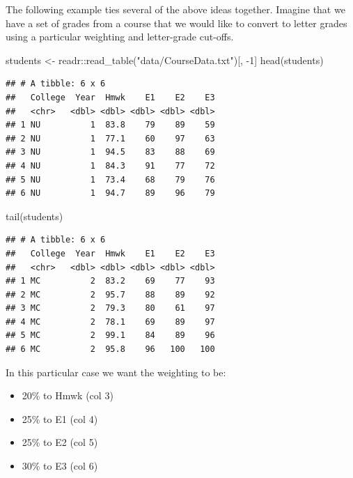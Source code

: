 \documentclass[
]{book}
\newenvironment{Shaded}{\begin{snugshade}}{\end{snugshade}}
\newcommand{\DecValTok}[1]{\textcolor[rgb]{0.00,0.00,0.81}{#1}}
\newcommand{\FunctionTok}[1]{\textcolor[rgb]{0.00,0.00,0.00}{#1}}
\newcommand{\NormalTok}[1]{#1}
\newcommand{\OtherTok}[1]{\textcolor[rgb]{0.56,0.35,0.01}{#1}}
\newcommand{\SpecialCharTok}[1]{\textcolor[rgb]{0.00,0.00,0.00}{#1}}
\newcommand{\StringTok}[1]{\textcolor[rgb]{0.31,0.60,0.02}{#1}}
\providecommand{\tightlist}{%
  \setlength{\itemsep}{0pt}\setlength{\parskip}{0pt}}
\begin{document}
The following example ties several of the above ideas together. Imagine that we have a set of grades from a course that we would like to convert to letter grades using a particular weighting and letter-grade cut-offs.

\begin{Shaded}
\begin{Highlighting}[]
\NormalTok{students }\OtherTok{\textless{}{-}}\NormalTok{ readr}\SpecialCharTok{::}\FunctionTok{read\_table}\NormalTok{(}\StringTok{"data/CourseData.txt"}\NormalTok{)[, }\SpecialCharTok{{-}}\DecValTok{1}\NormalTok{]}
\FunctionTok{head}\NormalTok{(students)}
\end{Highlighting}
\end{Shaded}

\begin{verbatim}
## # A tibble: 6 x 6
##   College  Year  Hmwk    E1    E2    E3
##   <chr>   <dbl> <dbl> <dbl> <dbl> <dbl>
## 1 NU          1  83.8    79    89    59
## 2 NU          1  77.1    60    97    63
## 3 NU          1  94.5    83    88    69
## 4 NU          1  84.3    91    77    72
## 5 NU          1  73.4    68    79    76
## 6 NU          1  94.7    89    96    79
\end{verbatim}

\begin{Shaded}
\begin{Highlighting}[]
\FunctionTok{tail}\NormalTok{(students)}
\end{Highlighting}
\end{Shaded}

\begin{verbatim}
## # A tibble: 6 x 6
##   College  Year  Hmwk    E1    E2    E3
##   <chr>   <dbl> <dbl> <dbl> <dbl> <dbl>
## 1 MC          2  83.2    69    77    93
## 2 MC          2  95.7    88    89    92
## 3 MC          2  79.3    80    61    97
## 4 MC          2  78.1    69    89    97
## 5 MC          2  99.1    84    89    96
## 6 MC          2  95.8    96   100   100
\end{verbatim}

In this particular case we want the weighting to be:

\begin{itemize}
\tightlist
\item
  20\% to Hmwk (col 3)
\item
  25\% to E1 (col 4)
\item
  25\% to E2 (col 5)
\item
  30\% to E3 (col 6)
\end{itemize}
\end{document}

